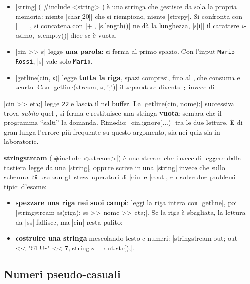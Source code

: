 \begin{itemize}
  \item \cc|string| (\cc|#include <string>|) è una stringa che gestisce da sola
        la propria memoria: niente \cc|char[20]| che si riempiono, niente
        \cc|strcpy|. Si confronta con \cc|==|, si concatena con \cc|+|,
        \cc|s.length()| ne dà la lunghezza, \cc|s[i]| il carattere $i$-esimo,
        \cc|s.empty()| dice se è vuota.
  \item \cc|cin >> s| legge \textbf{una parola}: si ferma al primo spazio.
        Con l'input \texttt{Mario Rossi}, \cc|s| vale solo \texttt{Mario}.
  \item \cc|getline(cin, s)| legge \textbf{tutta la riga}, spazi compresi,
        fino al \nl, che consuma e scarta. Con \cc|getline(stream, s, ';')|
        il separatore diventa \texttt{;} invece di \nl.
\end{itemize}

\begin{trappola}
\cc|cin >> eta;| legge \texttt{22} e lascia il \nl{} nel buffer. La
\cc|getline(cin, nome);| successiva trova \emph{subito} quel \nl, si ferma e
restituisce una stringa \textbf{vuota}: sembra che il programma ``salti'' la
domanda. Rimedio: \cc|cin.ignore(...)| tra le due letture. È di gran lunga
l'errore più frequente su questo argomento, sia nei quiz sia in laboratorio.
\end{trappola}

\textbf{stringstream} (\cc|#include <sstream>|) è uno stream che invece di
leggere dalla tastiera legge da una \cc|string|, oppure scrive in una
\cc|string| invece che sullo schermo. Si usa con gli stessi operatori di
\cc|cin| e \cc|cout|, e risolve due problemi tipici d'esame:
\begin{itemize}
  \item \textbf{spezzare una riga nei suoi campi}: leggi la riga intera con
        \cc|getline|, poi \cc|stringstream ss(riga); ss >> nome >> eta;|. Se la
        riga è sbagliata, la lettura da \cc|ss| fallisce, ma \cc|cin| resta pulito;
  \item \textbf{costruire una stringa} mescolando testo e numeri:
        \cc|stringstream out; out << "STU-" << 7; string s = out.str();|.
\end{itemize}

\subsection*{Numeri pseudo-casuali}

